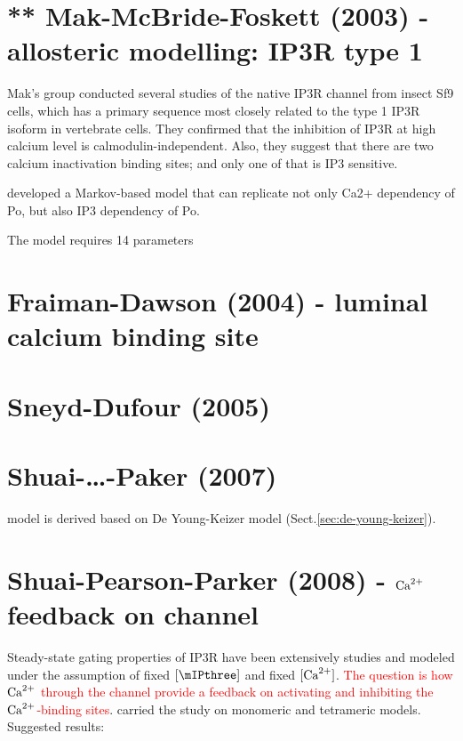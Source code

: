 \section{** Mak-McBride-Foskett (2003) - allosteric modelling: IP3R type 1}
\label{sec:Mak_2003_IP3R}

Mak's group conducted several studies of the native IP3R channel from insect Sf9
cells, which has a primary sequence most closely related to the type 1 IP3R
isoform in vertebrate cells. They confirmed that the inhibition of IP3R at high
calcium level is calmodulin-independent. 
Also, they suggest that there are two calcium inactivation binding sites; and
only one of that is IP3 sensitive.


\citep{mak2003} developed a Markov-based model that can replicate not only Ca2+
dependency of Po, but also IP3 dependency of Po. 

The model requires 14 parameters

\section{Fraiman-Dawson (2004) - luminal calcium binding site}
\label{sec:Fraiman_2004_IP3R}

\citep{fraiman2004mip3} 

\section{Sneyd-Dufour (2005)}

\citep{sneyd2005ip3r}


\section{Shuai-\ldots-Paker (2007)}
\label{sec:shuai_2007}

\citep{shuai2007kmip3r} model is derived based on De Young-Keizer model
(Sect.\ref{sec:de-young-keizer}). 

\section{Shuai-Pearson-Parker (2008) - ${\text{Ca}^{2+}}$ feedback on channel}
\label{sec:shuai_2008_Ca-feedback}

Steady-state gating properties of IP3R have been extensively studies and modeled
under the assumption of fixed $[\mIPthree]$ and fixed $[{\text{Ca}^{2+}}]$.
\textcolor{red}{The question is how ${\text{Ca}^{2+}}$ through the channel provide a feedback
on activating and inhibiting the ${\text{Ca}^{2+}}$-binding sites}. \citep{shuai2008} carried
the study on monomeric and tetrameric \tIPthreeR models. Suggested results:

